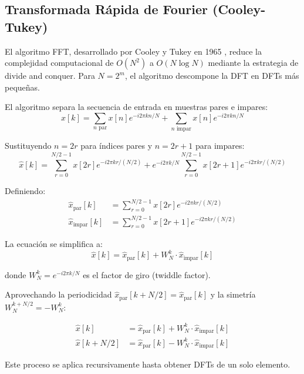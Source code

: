 \documentclass[a4paper]{article}
\begin{document}
\subsection{Transformada Rápida de Fourier (Cooley-Tukey)}

El algoritmo FFT, desarrollado por Cooley y Tukey en 1965 \cite{cooley1965algorithm}, reduce la complejidad computacional de $O(N^2)$ a $O(N \log N)$
mediante la estrategia de divide and conquer. Para $N = 2^m$, el algoritmo descompone la DFT en DFTs más pequeñas.

El algoritmo separa la secuencia de entrada en muestras pares e impares:
\begin{equation}
    \hat{x}[k] = \sum_{n \text{ par}} x[n] e^{-i2\pi kn/N} + \sum_{n \text{ impar}} x[n] e^{-i2\pi kn/N}
\end{equation}

Sustituyendo $n = 2r$ para índices pares y $n = 2r+1$ para impares:
\begin{equation}
    \hat{x}[k] = \sum_{r=0}^{N/2-1} x[2r] e^{-i2\pi kr/(N/2)} + e^{-i2\pi k/N} \sum_{r=0}^{N/2-1} x[2r+1] e^{-i2\pi kr/(N/2)}
\end{equation}

Definiendo:
\begin{align}
    \hat{x}_{\text{par}}[k]   & = \sum_{r=0}^{N/2-1} x[2r] e^{-i2\pi kr/(N/2)}   \\
    \hat{x}_{\text{impar}}[k] & = \sum_{r=0}^{N/2-1} x[2r+1] e^{-i2\pi kr/(N/2)}
\end{align}

La ecuación se simplifica a:
\begin{equation}
    \hat{x}[k] = \hat{x}_{\text{par}}[k] + W_N^k \cdot \hat{x}_{\text{impar}}[k]
\end{equation}

donde $W_N^k = e^{-i2\pi k/N}$ es el factor de giro (twiddle factor).

Aprovechando la periodicidad $\hat{x}_{\text{par}}[k + N/2] = \hat{x}_{\text{par}}[k]$ y la simetría $W_N^{k+N/2} = -W_N^k$:

\begin{align}
    \hat{x}[k]       & = \hat{x}_{\text{par}}[k] + W_N^k \cdot \hat{x}_{\text{impar}}[k] \\
    \hat{x}[k + N/2] & = \hat{x}_{\text{par}}[k] - W_N^k \cdot \hat{x}_{\text{impar}}[k]
\end{align}

Este proceso se aplica recursivamente hasta obtener DFTs de un solo elemento.
\end{document}
